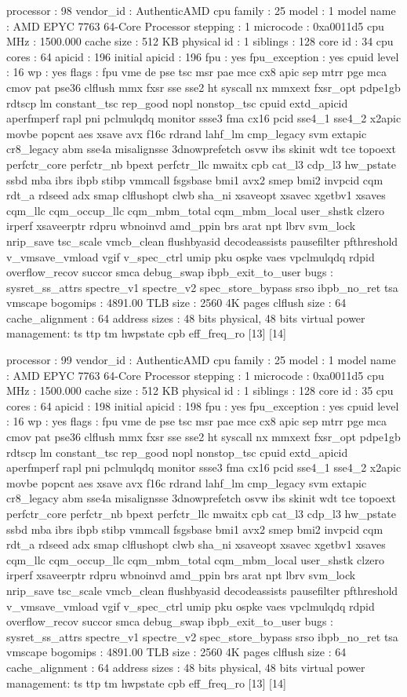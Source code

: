 processor	: 98
vendor_id	: AuthenticAMD
cpu family	: 25
model		: 1
model name	: AMD EPYC 7763 64-Core Processor
stepping	: 1
microcode	: 0xa0011d5
cpu MHz		: 1500.000
cache size	: 512 KB
physical id	: 1
siblings	: 128
core id		: 34
cpu cores	: 64
apicid		: 196
initial apicid	: 196
fpu		: yes
fpu_exception	: yes
cpuid level	: 16
wp		: yes
flags		: fpu vme de pse tsc msr pae mce cx8 apic sep mtrr pge mca cmov pat pse36 clflush mmx fxsr sse sse2 ht syscall nx mmxext fxsr_opt pdpe1gb rdtscp lm constant_tsc rep_good nopl nonstop_tsc cpuid extd_apicid aperfmperf rapl pni pclmulqdq monitor ssse3 fma cx16 pcid sse4_1 sse4_2 x2apic movbe popcnt aes xsave avx f16c rdrand lahf_lm cmp_legacy svm extapic cr8_legacy abm sse4a misalignsse 3dnowprefetch osvw ibs skinit wdt tce topoext perfctr_core perfctr_nb bpext perfctr_llc mwaitx cpb cat_l3 cdp_l3 hw_pstate ssbd mba ibrs ibpb stibp vmmcall fsgsbase bmi1 avx2 smep bmi2 invpcid cqm rdt_a rdseed adx smap clflushopt clwb sha_ni xsaveopt xsavec xgetbv1 xsaves cqm_llc cqm_occup_llc cqm_mbm_total cqm_mbm_local user_shstk clzero irperf xsaveerptr rdpru wbnoinvd amd_ppin brs arat npt lbrv svm_lock nrip_save tsc_scale vmcb_clean flushbyasid decodeassists pausefilter pfthreshold v_vmsave_vmload vgif v_spec_ctrl umip pku ospke vaes vpclmulqdq rdpid overflow_recov succor smca debug_swap ibpb_exit_to_user
bugs		: sysret_ss_attrs spectre_v1 spectre_v2 spec_store_bypass srso ibpb_no_ret tsa vmscape
bogomips	: 4891.00
TLB size	: 2560 4K pages
clflush size	: 64
cache_alignment	: 64
address sizes	: 48 bits physical, 48 bits virtual
power management: ts ttp tm hwpstate cpb eff_freq_ro [13] [14]

processor	: 99
vendor_id	: AuthenticAMD
cpu family	: 25
model		: 1
model name	: AMD EPYC 7763 64-Core Processor
stepping	: 1
microcode	: 0xa0011d5
cpu MHz		: 1500.000
cache size	: 512 KB
physical id	: 1
siblings	: 128
core id		: 35
cpu cores	: 64
apicid		: 198
initial apicid	: 198
fpu		: yes
fpu_exception	: yes
cpuid level	: 16
wp		: yes
flags		: fpu vme de pse tsc msr pae mce cx8 apic sep mtrr pge mca cmov pat pse36 clflush mmx fxsr sse sse2 ht syscall nx mmxext fxsr_opt pdpe1gb rdtscp lm constant_tsc rep_good nopl nonstop_tsc cpuid extd_apicid aperfmperf rapl pni pclmulqdq monitor ssse3 fma cx16 pcid sse4_1 sse4_2 x2apic movbe popcnt aes xsave avx f16c rdrand lahf_lm cmp_legacy svm extapic cr8_legacy abm sse4a misalignsse 3dnowprefetch osvw ibs skinit wdt tce topoext perfctr_core perfctr_nb bpext perfctr_llc mwaitx cpb cat_l3 cdp_l3 hw_pstate ssbd mba ibrs ibpb stibp vmmcall fsgsbase bmi1 avx2 smep bmi2 invpcid cqm rdt_a rdseed adx smap clflushopt clwb sha_ni xsaveopt xsavec xgetbv1 xsaves cqm_llc cqm_occup_llc cqm_mbm_total cqm_mbm_local user_shstk clzero irperf xsaveerptr rdpru wbnoinvd amd_ppin brs arat npt lbrv svm_lock nrip_save tsc_scale vmcb_clean flushbyasid decodeassists pausefilter pfthreshold v_vmsave_vmload vgif v_spec_ctrl umip pku ospke vaes vpclmulqdq rdpid overflow_recov succor smca debug_swap ibpb_exit_to_user
bugs		: sysret_ss_attrs spectre_v1 spectre_v2 spec_store_bypass srso ibpb_no_ret tsa vmscape
bogomips	: 4891.00
TLB size	: 2560 4K pages
clflush size	: 64
cache_alignment	: 64
address sizes	: 48 bits physical, 48 bits virtual
power management: ts ttp tm hwpstate cpb eff_freq_ro [13] [14]

